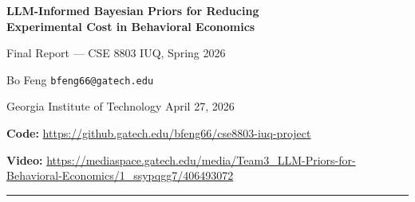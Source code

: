 \documentclass[11pt]{article}
\begin{document}
\begin{center}
  {\Large\bfseries LLM-Informed Bayesian Priors for Reducing\\
  Experimental Cost in Behavioral Economics}

  \vspace{0.6em}
  {\normalsize Final Report --- CSE 8803 IUQ, Spring 2026}

  \vspace{0.4em}
  {\normalsize Bo Feng \quad \texttt{bfeng66@gatech.edu}}

  \vspace{0.3em}
  {\small Georgia Institute of Technology \quad April 27, 2026}

  \vspace{0.6em}
  {\small \textbf{Code:} \url{https://github.gatech.edu/bfeng66/cse8803-iuq-project}}

  \vspace{0.2em}
  {\small \textbf{Video:} \url{https://mediaspace.gatech.edu/media/Team3_LLM-Priors-for-Behavioral-Economics/1_ssypqgg7/406493072}}
\end{center}

\vspace{0.3em}
\hrule
\vspace{0.6em}

\begin{abstract}
\noindent
Behavioral economic experiments are expensive: each datum costs participant fees, lab time,
and IRB overhead. We ask whether large language model (LLM) simulations can serve as an
informative Bayesian prior, reducing the human sample size needed to reach a target posterior
precision. We model dictator-game sharing ratios with a Beta likelihood and compare two pipelines:
(i) a flat-prior baseline solved by Metropolis--Hastings MCMC, and (ii) a frontier method that
encodes 500 GPT-4o pseudo-observations as a power prior~\citep{ibrahim2000power} and solves the
posterior with Stein Variational Gradient Descent~\citep{liu2016stein}.
On 137 dictator observations from \citet{vonblanckenburg2023giving}, the LLM prior achieves a
sample-size reduction ratio $\rho = n^*_{\mathrm{LLM}}/n^*_{\mathrm{flat}} \approx 0.26$ on the
giving game and $\rho \approx 0.55$ on the taking-game variant; coverage of
95\% posterior-predictive intervals tracks nominal under all but moderate upward prior
misspecification, where it falls to $\sim$83\%. A leakage ablation with \texttt{gpt-3.5-turbo}
(pre-Horton2023 cutoff) recovers an identical $\rho = 0.26$ but with markedly worse coverage
(0.83 vs 0.98 at $n{=}50$), indicating that the gpt-4o advantage is calibration quality, not
sample-size benefit, and that the result is not a pure training-data leakage artefact. We report the compute--accuracy
trade-off, document the regimes where the LLM prior helps and hurts, and discuss when SVGD
becomes a useful inference engine for higher-dimensional extensions of this template.
\end{abstract}
\end{document}
